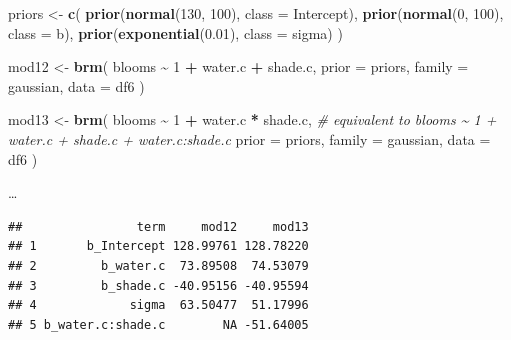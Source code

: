 \documentclass[
  a4paper,11pt,twoside,onecolumn,openright,final,oldfontcommands]{memoir}
\newenvironment{Shaded}{\begin{snugshade}}{\end{snugshade}}
\newcommand{\CommentTok}[1]{\textcolor[rgb]{0.56,0.35,0.01}{\textit{#1}}}
\newcommand{\DataTypeTok}[1]{\textcolor[rgb]{0.13,0.29,0.53}{#1}}
\newcommand{\DecValTok}[1]{\textcolor[rgb]{0.00,0.00,0.81}{#1}}
\newcommand{\FloatTok}[1]{\textcolor[rgb]{0.00,0.00,0.81}{#1}}
\newcommand{\KeywordTok}[1]{\textcolor[rgb]{0.13,0.29,0.53}{\textbf{#1}}}
\newcommand{\NormalTok}[1]{#1}
\newcommand{\OperatorTok}[1]{\textcolor[rgb]{0.81,0.36,0.00}{\textbf{#1}}}
\newcommand{\StringTok}[1]{\textcolor[rgb]{0.31,0.60,0.02}{#1}}
\theoremstyle{definition}
\theoremstyle{definition}
\theoremstyle{definition}
\theoremstyle{remark}
\begin{document}
\begin{Shaded}
\begin{Highlighting}[]
\NormalTok{priors \textless{}{-}}\StringTok{ }\KeywordTok{c}\NormalTok{(}
  \KeywordTok{prior}\NormalTok{(}\KeywordTok{normal}\NormalTok{(}\DecValTok{130}\NormalTok{, }\DecValTok{100}\NormalTok{), }\DataTypeTok{class =}\NormalTok{ Intercept),}
  \KeywordTok{prior}\NormalTok{(}\KeywordTok{normal}\NormalTok{(}\DecValTok{0}\NormalTok{, }\DecValTok{100}\NormalTok{), }\DataTypeTok{class =}\NormalTok{ b),}
  \KeywordTok{prior}\NormalTok{(}\KeywordTok{exponential}\NormalTok{(}\FloatTok{0.01}\NormalTok{), }\DataTypeTok{class =}\NormalTok{ sigma)}
\NormalTok{  )}

\NormalTok{mod12 \textless{}{-}}\StringTok{ }\KeywordTok{brm}\NormalTok{(}
\NormalTok{  blooms }\OperatorTok{\textasciitilde{}}\StringTok{ }\DecValTok{1} \OperatorTok{+}\StringTok{ }\NormalTok{water.c }\OperatorTok{+}\StringTok{ }\NormalTok{shade.c,}
  \DataTypeTok{prior =}\NormalTok{ priors,}
  \DataTypeTok{family =}\NormalTok{ gaussian,}
  \DataTypeTok{data =}\NormalTok{ df6}
\NormalTok{  )}
\end{Highlighting}
\end{Shaded}

\begin{Shaded}
\begin{Highlighting}[]
\NormalTok{mod13 \textless{}{-}}\StringTok{ }\KeywordTok{brm}\NormalTok{(}
\NormalTok{  blooms }\OperatorTok{\textasciitilde{}}\StringTok{ }\DecValTok{1} \OperatorTok{+}\StringTok{ }\NormalTok{water.c }\OperatorTok{*}\StringTok{ }\NormalTok{shade.c,}
  \CommentTok{\# equivalent to blooms \textasciitilde{} 1 + water.c + shade.c + water.c:shade.c}
  \DataTypeTok{prior =}\NormalTok{ priors,}
  \DataTypeTok{family =}\NormalTok{ gaussian,}
  \DataTypeTok{data =}\NormalTok{ df6}
\NormalTok{  )}
\end{Highlighting}
\end{Shaded}

\ldots{}

\begin{verbatim}
##                term     mod12     mod13
## 1       b_Intercept 128.99761 128.78220
## 2         b_water.c  73.89508  74.53079
## 3         b_shade.c -40.95156 -40.95594
## 4             sigma  63.50477  51.17996
## 5 b_water.c:shade.c        NA -51.64005
\end{verbatim}
\end{document}
